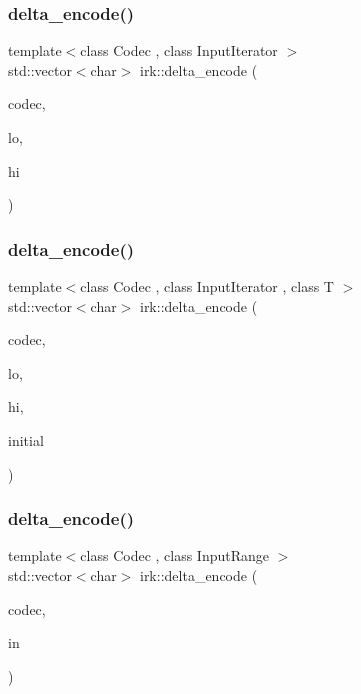 \mbox{\label{namespaceirk_a896bdd772f368d7c786993c1fce4c189}} 
\subsubsection{\texorpdfstring{delta\+\_\+encode()}{delta\_encode()}\hspace{0.1cm}{\footnotesize\ttfamily [1/3]}}
{\footnotesize\ttfamily template$<$class Codec , class Input\+Iterator $>$ \\
std\+::vector$<$char$>$ irk\+::delta\+\_\+encode (\begin{DoxyParamCaption}\item[{const Codec \&}]{codec,  }\item[{Input\+Iterator}]{lo,  }\item[{Input\+Iterator}]{hi }\end{DoxyParamCaption})}

\mbox{\label{namespaceirk_a8cf4a588f3d7bb35497c272e13e11cc8}} 
\subsubsection{\texorpdfstring{delta\+\_\+encode()}{delta\_encode()}\hspace{0.1cm}{\footnotesize\ttfamily [2/3]}}
{\footnotesize\ttfamily template$<$class Codec , class Input\+Iterator , class T $>$ \\
std\+::vector$<$char$>$ irk\+::delta\+\_\+encode (\begin{DoxyParamCaption}\item[{const Codec \&}]{codec,  }\item[{Input\+Iterator}]{lo,  }\item[{Input\+Iterator}]{hi,  }\item[{T}]{initial }\end{DoxyParamCaption})}

\mbox{\label{namespaceirk_ab11cd6640f103b27c78573d29c8ff423}} 
\subsubsection{\texorpdfstring{delta\+\_\+encode()}{delta\_encode()}\hspace{0.1cm}{\footnotesize\ttfamily [3/3]}}
{\footnotesize\ttfamily template$<$class Codec , class Input\+Range $>$ \\
std\+::vector$<$char$>$ irk\+::delta\+\_\+encode (\begin{DoxyParamCaption}\item[{const Codec \&}]{codec,  }\item[{Input\+Range}]{in }\end{DoxyParamCaption})}

